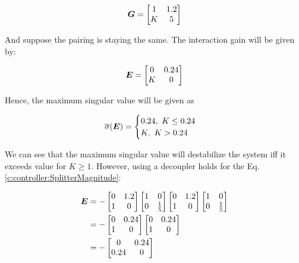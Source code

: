 \begin{align*}
\mbox{\boldmath$G$} = \begin{bmatrix}
1 & 1.2 \\
K & 5
\end{bmatrix}
\end{align*}

And suppose the pairing is staying the same. The interaction gain will be given by:

\begin{align*}
\mbox{\boldmath$E$} = \begin{bmatrix}
0 & 0.24 \\
K & 0 \\
\end{bmatrix}
\end{align*}

Hence, the maximum singular value will be given as

\begin{align*}
\overline{\sigma}(\mbox{\boldmath$E$}) = \begin{cases}
0.24 , ~K \leq 0.24 \\
K, ~K > 0.24
\end{cases}
\end{align*}

We can see that the maximum singular value will destabilize the system iff it exceeds value for $K \geq 1$. However, using a decoupler holds for the Eq.\ref{c:controller:SplitterMagnitude}:

\begin{align*}
\begin{split}
\mbox{\boldmath$E$} &= - \begin{bmatrix}
0 & 1.2 \\
1 & 0 
\end{bmatrix}\begin{bmatrix}
1 & 0 \\ 0 & \frac{1}{5}
\end{bmatrix}\begin{bmatrix}
0 & 1.2 \\
1 & 0 
\end{bmatrix}\begin{bmatrix}
1 & 0 \\ 0 & \frac{1}{5}
\end{bmatrix} \\
&= -  \begin{bmatrix}
0 & 0.24 \\
1 & 0 
\end{bmatrix}\begin{bmatrix}
0 & 0.24 \\ 1 & 0
\end{bmatrix} \\
&= -\begin{bmatrix}
0 & 0.24 \\ 0.24 & 0
\end{bmatrix}
\end{split}
\end{align*}

